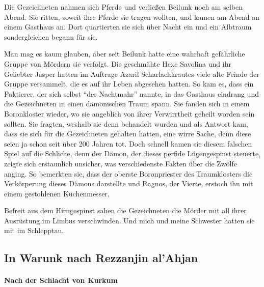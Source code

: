 Die Gezeichneten nahmen sich Pferde und verließen Beilunk noch am selben Abend. Sie ritten, soweit ihre Pferde sie tragen wollten, und kamen am Abend an einem Gasthaus an. Dort quartierten sie sich über Nacht ein und ein Albtraum sondergleichen begann für sie.

Man mag es kaum glauben, aber seit Beilunk hatte eine wahrhaft gefährliche Gruppe von Mördern sie verfolgt. Die geschmähte Hexe Savolina und ihr Geliebter Jasper hatten im Auftrage Azaril Scharlachkrautes viele alte Feinde der Gruppe versammelt, die es auf ihr Leben abgesehen hatten. So kam es, dass ein Paktierer, der sich selbst ``der Nachtmahr'' nannte, in das Gasthaus eindrang und die Gezeichneten in einen dämonischen Traum spann. Sie fanden sich in einem Boronkloster wieder, wo sie angeblich von ihrer Verwirrtheit geheilt worden sein sollten. Sie fragten, weshalb sie denn behandelt wurden und als Antwort kam, dass sie sich für die Gezeichneten gehalten hatten, eine wirre Sache, denn diese seien ja schon seit über 200 Jahren tot. Doch schnell kamen sie diesem falschen Spiel auf die Schliche, denn der Dämon, der dieses perfide Lügengespinst steuerte, zeigte sich erstaunlich unsicher, was verschiedenste Fakten über die Zwölfe anging. So bemerkten sie, dass der oberste Boronpriester des Traumklosters die Verkörperung dieses Dämons darstellte und Ragnos, der Vierte, erstoch ihn mit einem gestohlenen Küchenmesser.

Befreit aus dem Hirngespinst sahen die Gezeichneten die Mörder mit all ihrer Ausrüstung im Limbus verschwinden. Und mich und meine Schwester hatten sie mit im Schlepptau.

\subsection{In Warunk nach Rezzanjin al'Ahjan}

\paragraph{Nach der Schlacht von Kurkum}

